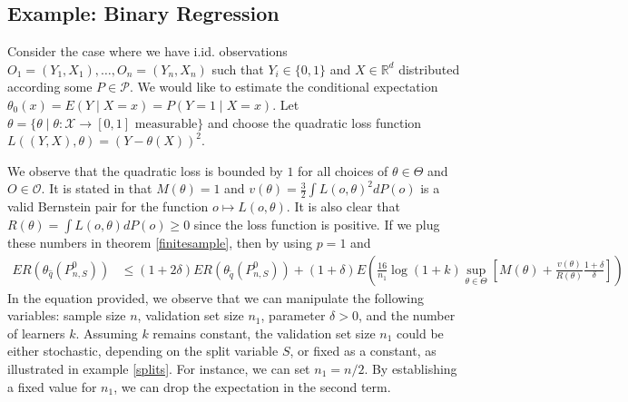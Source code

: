 \documentclass[11pt, a4paper]{article}
\theoremstyle{definition}
\theoremstyle{remark}
\newcommand{\q}{q}
\newcommand{\btheta}{\theta}
\begin{document}
\subsection{Example: Binary Regression}
Consider the case where we have i.id. observations $ O_1 = (Y_1 , X_1) , \dots , O_n = (Y_n , X_n) $ such that $ Y_i \in \{0, 1\} $ and $ X \in \mathbb{R}^{d} $ distributed according some $ P \in \mathcal{P} $. We would like to estimate the conditional expectation $ \btheta_0(x) = E(Y \mid X = x) = P(Y = 1 \mid X = x) $.  Let $ \btheta = \{\btheta \mid \btheta : \mathcal{X} \to [0,1] \text{ measurable} \}  $ and choose the quadratic loss function $ L((Y, X), \btheta) = (Y - \btheta(X))^2 $.


We observe that the quadratic loss is bounded by $ 1 $ for all choices of $ \btheta \in \Theta $ and $ O \in \mathcal{O} $. It is stated in \cite[7]{vaart06} that $ M(\btheta) = 1 $ and $ v(\btheta) = \frac{3}{2} \int L(o, \btheta)^2 dP(o)  $ is a valid Bernstein pair for the function $ o \mapsto L(o, \btheta)$. It is also clear that $ R(\btheta) = \int L(o , \btheta) d P(o) \geq 0  $ since the loss function is positive. If we plug these numbers in theorem \ref{finitesample}, then by using $ p = 1 $ and 
\begin{align*}
   ER(\btheta_{\hat{\q}}(P_{n, S}^{0})) &\leq(1 + 2 \delta) ER(\btheta_{ \tilde{\q}}(P_{n,S}^{0})) +(1 + \delta) E \left(  \frac{16}{n_1} \log (1 +k) \sup_{\btheta \in \Theta} \left[ M(\btheta) + \frac{v(\btheta)}{R(\btheta)} \frac{1 + \delta}{\delta}\right]\right)
\end{align*}
In the equation provided, we observe that we can manipulate the following variables: sample size $n$, validation set size $n_1$, parameter $\delta > 0$, and the number of learners $k$. Assuming $k$ remains constant, the validation set size $n_1$ could be either stochastic, depending on the split variable $S$, or fixed as a constant, as illustrated in example \ref{splits}. For instance, we can set $n_1 = n/2$. By establishing a fixed value for $n_1$, we can drop the expectation in the second term. 
\end{document}
